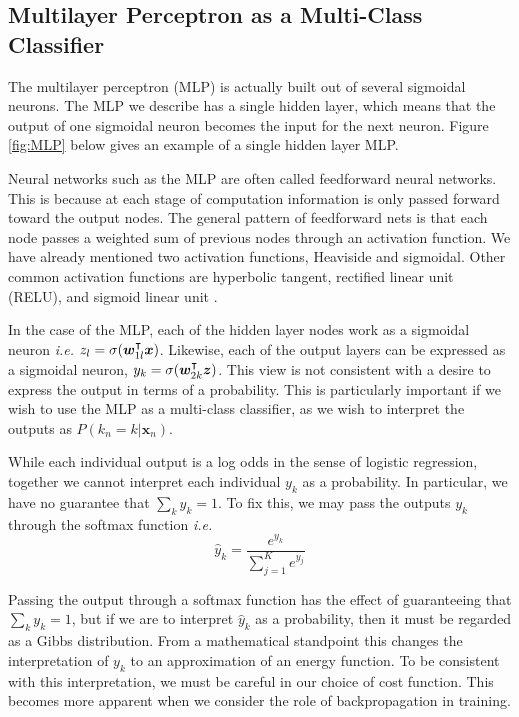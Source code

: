 \subsection{Multilayer Perceptron as a Multi-Class Classifier}
The multilayer perceptron (MLP) is actually built out of several sigmoidal neurons.  The MLP we describe has a single hidden layer, which means that the output of one sigmoidal neuron becomes the input for the next neuron.  Figure \ref{fig:MLP} below gives an example of a single hidden layer MLP.



Neural networks such as the MLP are often called feedforward neural networks.  This is because at each stage of computation information is only passed forward toward the output nodes.  The general pattern of feedforward nets is that each node passes a weighted sum of previous nodes through an activation function.  We have already mentioned two activation functions, Heaviside and sigmoidal. Other common activation functions are hyperbolic tangent, rectified linear unit (RELU), and sigmoid linear unit \cite{elfwingSiLU}.

In the case of the MLP, each of the hidden layer nodes work as a sigmoidal neuron \textit{i.e.} \( z_l = \sigma(\bm w_{1l}^{\intercal}\bm x) \). Likewise, each of the output layers can be expressed as a sigmoidal neuron, \( y_k = \sigma(\bm w_{2k}^{\intercal}\bm z) \). This view is not consistent with a desire to express the output in terms of a probability. This is particularly important if we wish to use the MLP as a multi-class classifier, as we wish to interpret the outputs as \( P(k_n=k|\bm x_n) \).

While each individual output is a log odds in the sense of logistic regression, together we cannot interpret each individual \( y_k \)  as a probability.  In particular, we have no guarantee that \( \sum_k y_k=1 \).  To fix this, we may pass the outputs \( y_k \) through the softmax function \textit{i.e.} 
\begin{equation}\label{MLPsoftmax}
\hat{y}_k = \frac{e^{y_k}}{\sum_{j=1}^{K} e^{y_j}}
\end{equation}

Passing the output through a softmax function has the effect of guaranteeing that \( \sum_k y_k=1 \), but if we are to interpret \( \hat{y}_k \) as a probability, then it must be regarded as a Gibbs distribution.  From a mathematical standpoint this changes the interpretation of \( y_k \) to an approximation of an energy function.  To be consistent with this interpretation, we must be careful in our choice of cost function.  This becomes more apparent when we consider the role of backpropagation in training.

